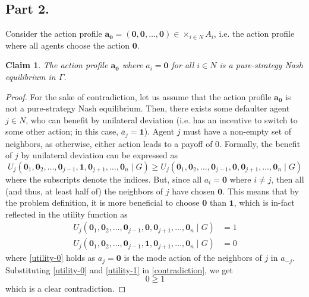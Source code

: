 \documentclass[9pt]{article}
\newtheorem{claim}{Claim}
\begin{document}
\subsection*{Part 2.}
Consider the action profile $\textbf{a}_{\textbf{0}} = (\textbf{0}, \textbf{0}, \dots, \textbf{0}) \in \times_{i \in N} A_{i}$, i.e. the action profile where all agents choose the action $\textbf{0}$.
\begin{claim}
    The action profile $\textbf{a}_{\textbf{0}}$ where $a_{i} = \textbf{0}$ for all $i \in N$ is a pure-strategy Nash equilibrium in $\Gamma$.
\end{claim}
\begin{proof}
    For the sake of contradiction, let us assume that the action profile $\textbf{a}_{\textbf{0}}$ is not a pure-strategy Nash equilibrium.
    Then, there exists some defaulter agent $j \in N$, who can benefit by unilateral deviation (i.e. has an incentive to switch to some other action; in this case, $\bar{a}_{j} = \textbf{1}$).
    Agent $j$ must have a non-empty set of neighbors, as otherwise, either action leads to a payoff of 0.
    Formally, the benefit of $j$ by unilateral deviation can be expressed as
    \begin{equation}
        \label{contradiction}
        U_{j}(\textbf{0}_{1}, \textbf{0}_{2}, \dots, \textbf{0}_{j-1}, \textbf{1}, \textbf{0}_{j+1}, \dots, \textbf{0}_{n} \mid G)
        \geq
        U_{j}(\textbf{0}_{1}, \textbf{0}_{2}, \dots, \textbf{0}_{j-1}, \textbf{0}, \textbf{0}_{j+1}, \dots, \textbf{0}_{n} \mid G)
    \end{equation}
    where the subscripts denote the indices.
    But, since all $a_{i} = \textbf{0}$ where $i \neq j$, then all (and thus, at least half of) the neighbors of $j$ have chosen $\textbf{0}$.
    This means that by the problem definition, it is more beneficial to choose $\textbf{0}$ than $\textbf{1}$, which is in-fact reflected in the utility function as
    \begin{align}
        \label{utility-0}
        U_{j}(\textbf{0}_{1}, \textbf{0}_{2}, \dots, \textbf{0}_{j-1}, \textbf{0}, \textbf{0}_{j+1}, \dots, \textbf{0}_{n} \mid G) &= 1 \\
        \label{utility-1}
        U_{j}(\textbf{0}_{1}, \textbf{0}_{2}, \dots, \textbf{0}_{j-1}, \textbf{1}, \textbf{0}_{j+1}, \dots, \textbf{0}_{n} \mid G) &= 0
    \end{align}
    where \eqref{utility-0} holds as $a_{j} = \textbf{0}$ is the mode action of the neighbors of $j$ in $a_{-j}$.
    Substituting \eqref{utility-0} and \eqref{utility-1} in \eqref{contradiction}, we get
    \begin{equation}
        0 \geq 1
    \end{equation}
    which is a clear contradiction.
\end{proof}
\end{document}
